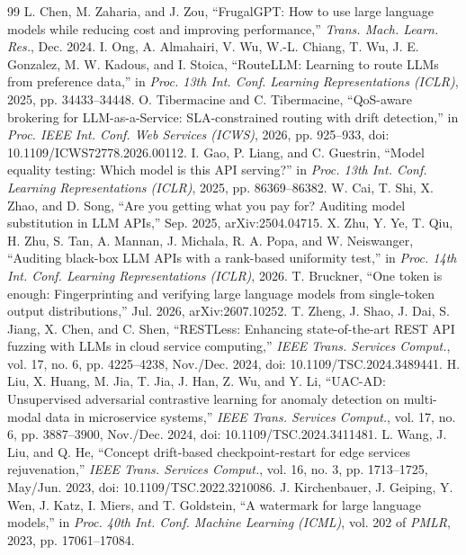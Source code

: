 \begin{thebibliography}{99}
 L. Chen, M. Zaharia, and J. Zou, ``FrugalGPT: How to use large language models while reducing cost and improving performance,'' \emph{Trans. Mach. Learn. Res.}, Dec. 2024.
 I. Ong, A. Almahairi, V. Wu, W.-L. Chiang, T. Wu, J. E. Gonzalez, M. W. Kadous, and I. Stoica, ``RouteLLM: Learning to route LLMs from preference data,'' in \emph{Proc. 13th Int. Conf. Learning Representations (ICLR)}, 2025, pp. 34433--34448.
 O. Tibermacine and C. Tibermacine, ``QoS-aware brokering for LLM-as-a-Service: SLA-constrained routing with drift detection,'' in \emph{Proc. IEEE Int. Conf. Web Services (ICWS)}, 2026, pp. 925--933, doi: 10.1109/ICWS72778.2026.00112.
 I. Gao, P. Liang, and C. Guestrin, ``Model equality testing: Which model is this API serving?'' in \emph{Proc. 13th Int. Conf. Learning Representations (ICLR)}, 2025, pp. 86369--86382.
 W. Cai, T. Shi, X. Zhao, and D. Song, ``Are you getting what you pay for? Auditing model substitution in LLM APIs,'' Sep. 2025, arXiv:2504.04715.
 X. Zhu, Y. Ye, T. Qiu, H. Zhu, S. Tan, A. Mannan, J. Michala, R. A. Popa, and W. Neiswanger, ``Auditing black-box LLM APIs with a rank-based uniformity test,'' in \emph{Proc. 14th Int. Conf. Learning Representations (ICLR)}, 2026.
 T. Bruckner, ``One token is enough: Fingerprinting and verifying large language models from single-token output distributions,'' Jul. 2026, arXiv:2607.10252.
 T. Zheng, J. Shao, J. Dai, S. Jiang, X. Chen, and C. Shen, ``RESTLess: Enhancing state-of-the-art REST API fuzzing with LLMs in cloud service computing,'' \emph{IEEE Trans. Services Comput.}, vol. 17, no. 6, pp. 4225--4238, Nov./Dec. 2024, doi: 10.1109/TSC.2024.3489441.
 H. Liu, X. Huang, M. Jia, T. Jia, J. Han, Z. Wu, and Y. Li, ``UAC-AD: Unsupervised adversarial contrastive learning for anomaly detection on multi-modal data in microservice systems,'' \emph{IEEE Trans. Services Comput.}, vol. 17, no. 6, pp. 3887--3900, Nov./Dec. 2024, doi: 10.1109/TSC.2024.3411481.
 L. Wang, J. Liu, and Q. He, ``Concept drift-based checkpoint-restart for edge services rejuvenation,'' \emph{IEEE Trans. Services Comput.}, vol. 16, no. 3, pp. 1713--1725, May/Jun. 2023, doi: 10.1109/TSC.2022.3210086.
 J. Kirchenbauer, J. Geiping, Y. Wen, J. Katz, I. Miers, and T. Goldstein, ``A watermark for large language models,'' in \emph{Proc. 40th Int. Conf. Machine Learning (ICML)}, vol. 202 of \emph{PMLR}, 2023, pp. 17061--17084.

\end{thebibliography}
